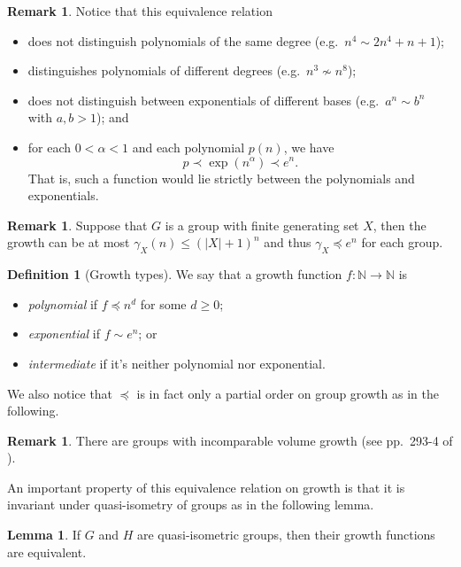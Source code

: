 \documentclass[11pt,a4paper,reqno]{amsart}
\theoremstyle{plain}
\theoremstyle{definition}
\newtheorem{lemma}[theorem]{Lemma}
\newtheorem{definition}[theorem]{Definition}
\theoremstyle{definition}
\newtheorem{remark}[theorem]{Remark}
\renewcommand\leq\leqslant
\renewcommand\geq\geqslant
\begin{document}
\begin{remark}
	Notice that this equivalence relation
	\begin{itemize}
		\item does not distinguish polynomials of the same degree (e.g.~{\color{red}$n^4 \sim 2n^4+ n + 1$});
		\item distinguishes polynomials of different degrees (e.g.~{\color{red}$n^3 \not\sim n^8$});
		\item does not distinguish between exponentials of different bases (e.g.~{\color{red}$a^n \sim b^n$ with $a,b > 1$}); and
		\item for each $0<\alpha <1$ and each polynomial $p(n)$, we have
		\[
		p \prec \exp(n^{\alpha}) \prec e^n.
		\]
		That is, such a function would lie strictly between the polynomials and exponentials.
	\end{itemize}
\end{remark}

\begin{remark}
Suppose that $G$ is a group with finite generating set $X$, then the growth can be at most $\gamma_X(n) \leq (|X|+1)^n$ and thus $\gamma_X \preccurlyeq e^n$ for each group.
\end{remark}

\begin{definition}[Growth types]
	We say that a growth function $f\colon \mathbb{N}\to\mathbb{N}$ is
	\begin{itemize}
		\item \emph{polynomial} if $f\preccurlyeq n^d$ for some $d\geq 0$;
		\item \emph{exponential} if $f \sim e^n$; or
		\item \emph{intermediate} if it's neither polynomial nor exponential.
	\end{itemize}
\end{definition}

We also notice that $\preccurlyeq$ is in fact only a partial order on group growth as in the following.

\begin{remark}
	There are groups with incomparable volume growth (see pp.~293-4 of \cite{GrigrochukInter}).
\end{remark}

An important property of this equivalence relation on growth is that it is invariant under quasi-isometry of groups as in the following lemma.

\begin{lemma}
	If $G$ and $H$ are quasi-isometric groups, then their growth functions are equivalent.
\end{lemma}
\end{document}
